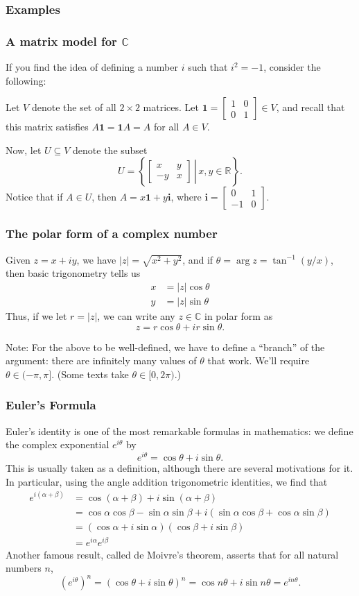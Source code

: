 \documentclass[11pt,t]{beamer}
\newcommand{\R}{\mathbb{R}}
\newcommand{\C}{\mathbb{C}}
\newcommand{\abs}[1]{\lvert #1\rvert}
\begin{document}
\begin{frame}
\frametitle{Examples}

\end{frame}
\begin{frame}
\frametitle{A matrix model for $\C$}
If you find the idea of defining a number $i$ such that $i^2=-1$, consider the following:

Let $V$ denote the set of all $2\times 2$ matrices. Let $\mathbf{1}=\begin{bmatrix}1&0\\0&1\end{bmatrix}\in V$, and recall that this matrix satisfies $A\mathbf{1}=\mathbf{1}A=A$ for all $A\in V$.

Now, let $U\subseteq V$ denote the subset
\[
U = \left\{\left.\begin{bmatrix}x&y\\-y&x\end{bmatrix}\,\right|\, x,y\in\R\right\}.
\]
Notice that if $A\in U$, then $A = x\mathbf{1}+y\mathbf{i}$, where $\mathbf{i}=\begin{bmatrix}0&1\\-1&0\end{bmatrix}$.
\end{frame}
\begin{frame}
\frametitle{The polar form of a complex number}
Given $z=x+iy$, we have $\abs{z}=\sqrt{x^2+y^2}$, and if $\theta = \arg z = \tan^{-1}(y/x)$, then basic trigonometry tells us
\begin{align*}
 x & = \abs{z}\cos\theta\\
 y & = \abs{z}\sin\theta
\end{align*}
Thus, if we let $r=\abs{z}$, we can write any $z\in \C$ in \alert{polar form} as
\[
z = r\cos\theta +ir\sin\theta.
\]

\alert{Note:} For the above to be well-defined, we have to define a ``branch'' of the argument: there are infinitely many values of $\theta$ that work. We'll require $\theta\in (-\pi,\pi]$. (Some texts take $\theta \in [0,2\pi)$.)
\end{frame}
\begin{frame}\frametitle{Euler's Formula}
\alert{Euler's identity} is one of the most remarkable formulas in mathematics: we define the complex exponential $e^{i\theta}$ by
\[
e^{i\theta} = \cos\theta+i\sin\theta.
\]
This is usually taken as a definition, although there are several motivations for it. In particular, using the angle addition trigonometric identities, we find that
\begin{align*}
e^{i(\alpha+\beta)} &= \cos(\alpha+\beta) + i\sin(\alpha+\beta)\\
& = \cos\alpha\cos\beta - \sin\alpha\sin\beta + i(\sin\alpha\cos\beta+\cos\alpha\sin\beta)\\
& = (\cos\alpha + i\sin\alpha)(\cos\beta+i\sin\beta)\\
& = e^{i\alpha}e^{i\beta}
\end{align*}
Another famous result, called \alert{de Moivre's theorem}, asserts that for all natural numbers $n$,
\[
(e^{i\theta})^n = (\cos\theta+i\sin \theta)^n = \cos n\theta + i\sin n\theta = e^{in\theta}.
\]

\end{frame}
\end{document}
